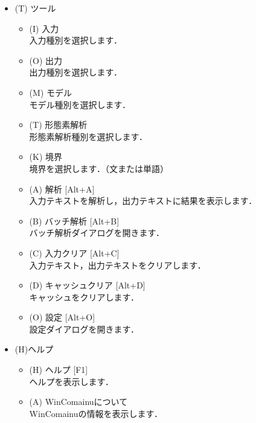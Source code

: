 \documentclass[titlepage]{jarticle}
\begin{document}
\begin{itemize}
\item (T) ツール
\begin{itemize}
\item (I) 入力 \\
入力種別を選択します．
\item (O) 出力 \\
出力種別を選択します．
\item (M) モデル \\
モデル種別を選択します．
\item (T) 形態素解析 \\
形態素解析種別を選択します．
\item (K) 境界 \\
境界を選択します．（文または単語）
\item (A) 解析 [Alt+A] \\
入力テキストを解析し，出力テキストに結果を表示します．
\item (B) バッチ解析 [Alt+B] \\
バッチ解析ダイアログを開きます．
\item (C) 入力クリア [Alt+C] \\
入力テキスト，出力テキストをクリアします．
\item (D) キャッシュクリア [Alt+D] \\
キャッシュをクリアします．
\item (O) 設定 [Alt+O] \\
設定ダイアログを開きます．
\end{itemize}
\item (H)ヘルプ
\begin{itemize}
\item (H) ヘルプ [F1] \\
ヘルプを表示します．
\item (A) WinComainuについて \\
WinComainuの情報を表示します．
\end{itemize}
\end{itemize}
\end{document}
